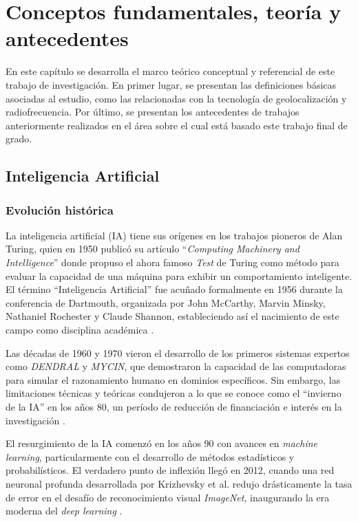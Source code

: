 \fancyhead{}
\fancyfoot{}

\newtheorem{teorema}{Teorema}

\pagestyle{plain}

\chapter{Conceptos fundamentales, teoría y antecedentes}

En este capítulo se desarrolla el marco teórico conceptual y referencial de este trabajo de investigación. En primer lugar, se presentan las definiciones básicas asociadas al estudio, como las relacionadas con la tecnología de geolocalización y radiofrecuencia. Por último, se presentan los antecedentes de trabajos anteriormente realizados en el área sobre el cual está basado este trabajo final de grado.


\section{Inteligencia Artificial}
\subsection{Evolución histórica}
La inteligencia artificial (IA) tiene sus orígenes en los trabajos pioneros de Alan Turing, quien en 1950 publicó su artículo ``\textit{Computing Machinery and Intelligence}'' donde propuso el ahora famoso \textit{Test} de Turing como método para evaluar la capacidad de una máquina para exhibir un comportamiento inteligente. El término ``Inteligencia Artificial'' fue acuñado formalmente en 1956 durante la conferencia de Dartmouth, organizada por John McCarthy, Marvin Minsky, Nathaniel Rochester y Claude Shannon, estableciendo así el nacimiento de este campo como disciplina académica \cite{turing1950}.

Las décadas de 1960 y 1970 vieron el desarrollo de los primeros sistemas expertos como \textit{DENDRAL} y \textit{MYCIN}, que demostraron la capacidad de las computadoras para simular el razonamiento humano en dominios específicos. Sin embargo, las limitaciones técnicas y teóricas condujeron a lo que se conoce como el ``invierno de la IA'' en los años 80, un período de reducción de financiación e interés en la investigación \cite{feigenbaum1988}.

El resurgimiento de la IA comenzó en los años 90 con avances en \textit{machine learning}, particularmente con el desarrollo de métodos estadísticos y probabilísticos. El verdadero punto de inflexión llegó en 2012, cuando una red neuronal profunda desarrollada por Krizhevsky et al. redujo drásticamente la tasa de error en el desafío de reconocimiento visual \textit{ImageNet}, inaugurando la era moderna del \textit{deep learning} \cite{krizhevsky2012}.

